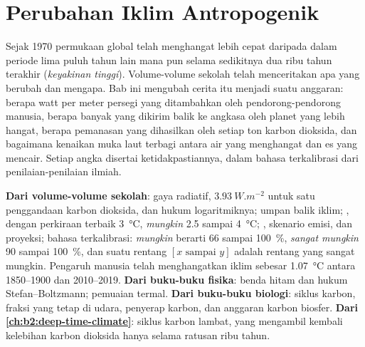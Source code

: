 \chapter{Perubahan Iklim Antropogenik}\label{ch:b2:anthropogenic-climate-change}

Sejak 1970 permukaan global telah menghangat lebih cepat daripada dalam periode lima puluh tahun lain mana pun selama
sedikitnya dua ribu tahun terakhir (\emph{keyakinan tinggi}). Volume-volume sekolah telah menceritakan apa yang berubah dan
mengapa. Bab ini mengubah cerita itu menjadi suatu anggaran: berapa watt per meter persegi yang ditambahkan oleh
pendorong-pendorong manusia, berapa banyak yang dikirim balik ke angkasa oleh planet yang lebih hangat, berapa pemanasan yang dihasilkan oleh setiap ton karbon
dioksida, dan bagaimana kenaikan muka laut terbagi antara air yang menghangat dan es yang mencair. Setiap angka
disertai ketidakpastiannya, dalam bahasa terkalibrasi dari penilaian-penilaian ilmiah.

\begin{recall}
\textbf{Dari volume-volume sekolah}: gaya radiatif, $\qty{3.93}{W.m^{-2}}$ untuk satu penggandaan
karbon dioksida, dan hukum logaritmiknya; umpan balik iklim; , dengan perkiraan
terbaik \qty{3}{\celsius}, \emph{mungkin} 2.5 sampai \qty{4}{\celsius}; , skenario emisi,
dan proyeksi; bahasa terkalibrasi: \emph{mungkin} berarti 66 sampai \qty{100}{\percent}, \emph{sangat
mungkin} 90 sampai \qty{100}{\percent}, dan suatu rentang $[x \text{ sampai } y]$ adalah rentang yang sangat mungkin. Pengaruh
manusia telah menghangatkan iklim sebesar \qty{1.07}{\celsius} antara 1850--1900 dan 2010--2019.
\textbf{Dari buku-buku fisika}: benda hitam dan hukum Stefan--Boltzmann; pemuaian termal.
\textbf{Dari buku-buku biologi}: siklus karbon, fraksi yang tetap di udara, penyerap karbon, dan
anggaran karbon biosfer. \textbf{Dari \cref{ch:b2:deep-time-climate}}: siklus karbon lambat,
yang mengambil kembali kelebihan karbon dioksida hanya selama ratusan ribu tahun.
\end{recall}

